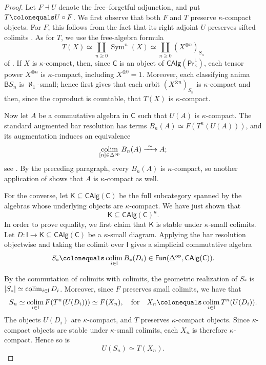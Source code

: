 \begin{proof}
Let $F\dashv U$ denote the free–forgetful adjunction, and put $T\colonequals U\circ F$. We first observe that both $F$ and $T$ preserve $\kappa$-compact objects. For $F$, this follows from the fact that its right adjoint $U$ preserves sifted colimits \cite[Cor.~3.2.3.2]{higheralgebra}. As for $T$, we use the free-algebra formula
\[T(X)\simeq \coprod_{n\geq 0}\operatorname{Sym}^n(X)\simeq \coprod_{n\geq 0}(X^{\otimes n})_{S_n}\]
of \cite[Ex.~3.1.3.14]{higheralgebra}. If $X$ is $\kappa$-compact, then, since $\mathsf{C}$ is an object of $\mathsf{CAlg}(\mathsf{Pr}^\mathsf{L}_\kappa)$, each tensor power $X^{\otimes n}$ is $\kappa$-compact, including $X^{\otimes 0}=1$. Moreover, each classifying anima $\mathsf{B}S_n$ is $\aleph_1$-small; hence \cite[Tag~\href{https://kerodon.net/tag/064X}{064X}]{kerodon} first gives that each orbit $(X^{\otimes n})_{S_n}$ is $\kappa$-compact and then, since the coproduct is countable, that $T(X)$ is $\kappa$-compact.

Now let $A$ be a commutative algebra in $\mathsf{C}$ such that $U(A)$ is $\kappa$-compact. The standard augmented bar resolution has terms $B_n(A)\simeq F(T^n(U(A)))$, and its augmentation induces an equivalence
\[\operatornamewithlimits{colim}_{[n]\in \Delta^\mathrm{op}}B_n(A)\xrightarrow{\ \sim\ }A;\]
see \cite[Prop.~4.7.3.14 and Lem.~3.2.2.6]{higheralgebra}. By the preceding paragraph, every $B_n(A)$ is $\kappa$-compact, so another application of \cite[Tag~\href{https://kerodon.net/tag/064X}{064X}]{kerodon} shows that $A$ is $\kappa$-compact as well.

For the converse, let $\mathsf{K}\subseteq \mathsf{CAlg}(\mathsf{C})$ be the full subcategory spanned by the algebras whose underlying objects are $\kappa$-compact. We have just shown that
\[\mathsf{K}\subseteq \mathsf{CAlg}(\mathsf{C})^\kappa.\]
In order to prove equality, we first claim that $\mathsf{K}$ is stable under $\kappa$-small colimits. Let $D\colon \mathsf{I}\to \mathsf{K}\subseteq \mathsf{CAlg}(\mathsf{C})$ be a $\kappa$-small diagram. Applying the bar resolution objectwise and taking the colimit over $\mathsf{I}$ gives a simplicial commutative algebra
\[S_\ast\colonequals \operatornamewithlimits{colim}_{i\in \mathsf{I}} B_\ast(D_i)\in \mathsf{Fun}(\Delta^\mathrm{op},\mathsf{CAlg}(\mathsf{C})).\]

By the commutation of colimits with colimits, the geometric realization of $S_\ast$ is $\mleft|S_\ast\mright|\simeq \operatornamewithlimits{colim}_{i\in \mathsf{I}}D_i$. Moreover, since $F$ preserves small colimits, we have that
\[S_n\simeq \operatornamewithlimits{colim}_{i\in \mathsf{I}} F(T^n(U(D_i)))\simeq F(X_n), \quad \text{for}\quad X_n\colonequals \operatornamewithlimits{colim}_{i\in \mathsf{I}}T^n(U(D_i)).\]
The objects $U(D_i)$ are $\kappa$-compact, and $T$ preserves $\kappa$-compact objects. Since $\kappa$-compact objects are stable under $\kappa$-small colimits, each $X_n$ is therefore $\kappa$-compact. Hence so is
\[U(S_n)\simeq T(X_n).\]


\end{proof}
